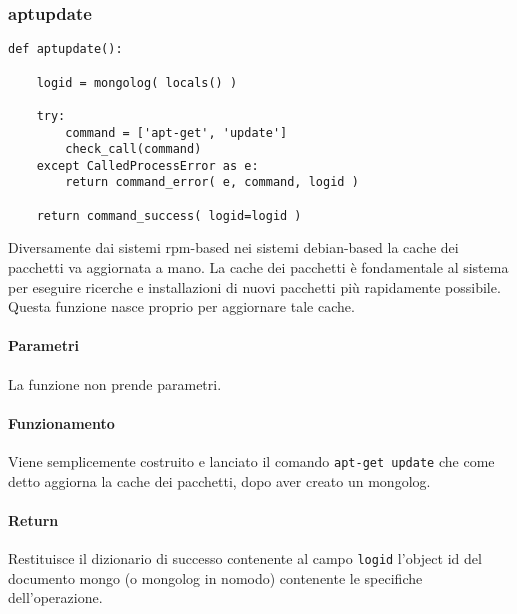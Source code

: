 \documentclass[11pt]{article}
\begin{document}
\subsubsection{aptupdate}\label{aptupdate}
\begin{lstlisting}
def aptupdate():

    logid = mongolog( locals() )

    try:
        command = ['apt-get', 'update']
        check_call(command)
    except CalledProcessError as e:
        return command_error( e, command, logid )

    return command_success( logid=logid )
\end{lstlisting}
Diversamente dai sistemi rpm-based nei sistemi debian-based la cache dei pacchetti va aggiornata a mano. La cache dei
pacchetti è fondamentale al sistema per eseguire ricerche e installazioni di nuovi pacchetti più rapidamente possibile.
Questa funzione nasce proprio per aggiornare tale cache.
\paragraph{Parametri}
La funzione non prende parametri.
\paragraph{Funzionamento}
Viene semplicemente costruito e lanciato il comando \texttt{apt-get update} che come detto aggiorna la cache dei pacchetti,
dopo aver creato un mongolog.
\paragraph{Return}
Restituisce il dizionario di successo contenente al campo \texttt{logid} l'object id del documento mongo (o mongolog in nomodo)
contenente le specifiche dell'operazione.
\end{document}
